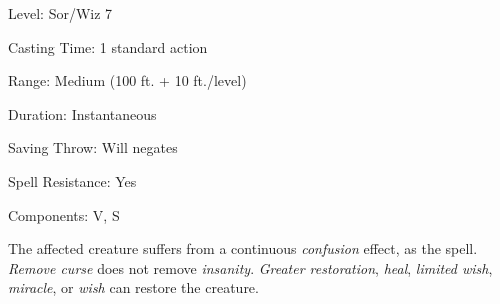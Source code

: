
\begin{description*}
\item[Level:] Sor/Wiz 7
\item[Casting Time:] 1 standard action
\item[Range:] Medium (100 ft. + 10 ft./level)
\item[Duration:] Instantaneous
\item[Saving Throw:] Will negates
\item[Spell Resistance:] Yes
\item[Components:] V, S
\end{description*}

The affected creature suffers from a continuous \textit{confusion} effect, as the
spell.
\textit{Remove curse} does not remove \textit{insanity}. \textit{Greater restoration},
\textit{heal}, \textit{limited wish}, \textit{miracle}, or \textit{wish} can restore
the creature.